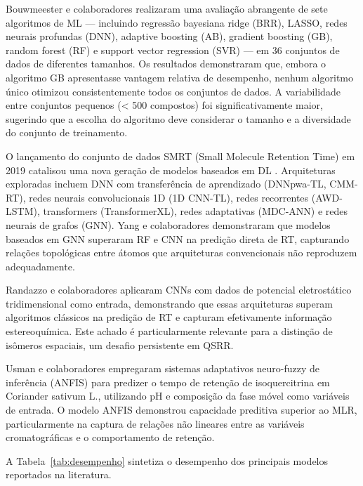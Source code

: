 \documentclass[preprint,12pt]{elsarticle}
\begin{document}
Bouwmeester e colaboradores \cite{bouwmeester2020} realizaram uma avaliação abrangente de sete algoritmos de ML — incluindo regressão bayesiana ridge (BRR), LASSO, redes neurais profundas (DNN), adaptive boosting (AB), gradient boosting (GB), random forest (RF) e support vector regression (SVR) — em 36 conjuntos de dados de diferentes tamanhos. Os resultados demonstraram que, embora o algoritmo GB apresentasse vantagem relativa de desempenho, nenhum algoritmo único otimizou consistentemente todos os conjuntos de dados. A variabilidade entre conjuntos pequenos (< 500 compostos) foi significativamente maior, sugerindo que a escolha do algoritmo deve considerar o tamanho e a diversidade do conjunto de treinamento.

O lançamento do conjunto de dados SMRT (Small Molecule Retention Time) em 2019 catalisou uma nova geração de modelos baseados em DL \cite{singh2024}. Arquiteturas exploradas incluem DNN com transferência de aprendizado (DNNpwa-TL, CMM-RT), redes neurais convolucionais 1D (1D CNN-TL), redes recorrentes (AWD-LSTM), transformers (TransformerXL), redes adaptativas (MDC-ANN) e redes neurais de grafos (GNN). Yang e colaboradores \cite{yang2023} demonstraram que modelos baseados em GNN superaram RF e CNN na predição direta de RT, capturando relações topológicas entre átomos que arquiteturas convencionais não reproduzem adequadamente.

Randazzo e colaboradores \cite{randazzo2023} aplicaram CNNs com dados de potencial eletrostático tridimensional como entrada, demonstrando que essas arquiteturas superam algoritmos clássicos na predição de RT e capturam efetivamente informação estereoquímica. Este achado é particularmente relevante para a distinção de isômeros espaciais, um desafio persistente em QSRR.

Usman e colaboradores \cite{usman2021} empregaram sistemas adaptativos neuro-fuzzy de inferência (ANFIS) para predizer o tempo de retenção de isoquercitrina em Coriander sativum L., utilizando pH e composição da fase móvel como variáveis de entrada. O modelo ANFIS demonstrou capacidade preditiva superior ao MLR, particularmente na captura de relações não lineares entre as variáveis cromatográficas e o comportamento de retenção.

A Tabela~\ref{tab:desempenho} sintetiza o desempenho dos principais modelos reportados na literatura.
\end{document}
